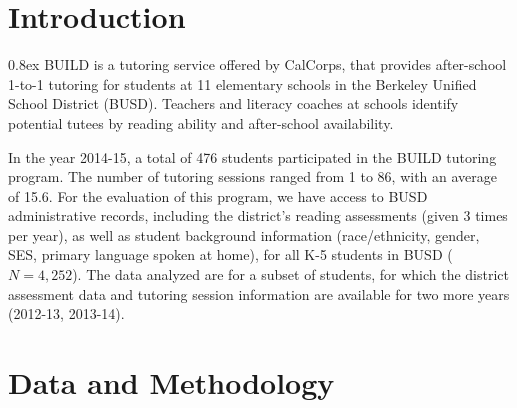 \documentclass[a0,landscape]{a0poster}
\begin{document}
\vspace{0.5cm} %



\begin{multicols}{3} %



\color{SaddleBrown} %

\section*{Introduction}

\parskip 0.8ex
BUILD is a tutoring service offered by CalCorps, that provides
after-school 1-to-1 tutoring for students at 11 elementary schools
in the Berkeley Unified School District (BUSD).
Teachers and literacy coaches at schools identify potential tutees
by reading ability and after-school availability.

In the year 2014-15, a total of 476 students participated in the
BUILD tutoring program. The number of tutoring sessions ranged
from 1 to 86, with an average of 15.6.
For the evaluation of this program, we have access to BUSD
administrative records, including the district's reading assessments
(given 3 times per year), as well as student background information
(race/ethnicity, gender, SES, primary language spoken at home),
for all K-5 students in BUSD ($N = 4,252$).
The data analyzed are for a subset of students, for which the district
assessment data and tutoring session information are available
for two more years (2012-13, 2013-14).


\color{NavyBlue}
\section*{Data and Methodology}


\end{multicols}
\end{document}
